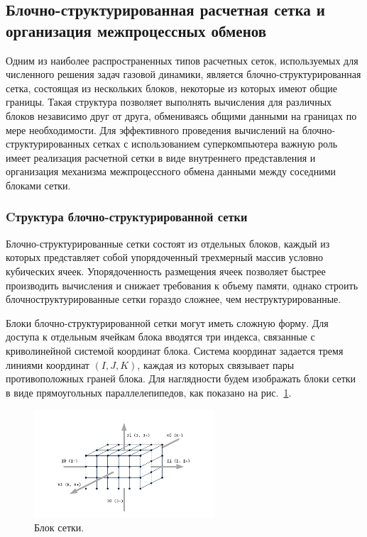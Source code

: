 \subsection{Блочно-структурированная расчетная сетка и организация межпроцессных обменов}

Одним из наиболее распространенных типов расчетных сеток, используемых для численного решения задач газовой динамики, является блочно-структурированная сетка, состоящая из нескольких блоков, некоторые из которых имеют общие границы.
Такая структура позволяет выполнять вычисления для различных блоков независимо друг от друга, обмениваясь общими данными на границах по мере необходимости.
Для эффективного проведения вычислений на блочно-структурированных сетках с использованием суперкомпьютера важную роль имеет реализация расчетной сетки в виде внутреннего представления и организация механизма межпроцессного обмена данными между соседними блоками сетки.

\subsubsection{Cтруктура блочно-структурированной сетки}

Блочно-структурированные сетки состоят из отдельных блоков, каждый из которых представляет собой упорядоченный трехмерный массив условно кубических ячеек.
Упорядоченность размещения ячеек позволяет быстрее производить вычисления и снижает требования к объему памяти, однако строить блочноструктурированные сетки гораздо сложнее, чем неструктурированные.

Блоки блочно-структурированной сетки могут иметь сложную форму.
Для доступа к отдельным ячейкам блока вводятся три индекса, связанные с криволинейной системой координат блока.
Система координат задается тремя линиями координат $(I, J, K)$, каждая из которых связывает пары противоположных граней блока.
Для наглядности будем изображать блоки сетки в виде прямоугольных параллелепипедов, как показано на рис.~\ref{fig:text_2_block_block}.

\begin{figure}[ht]
	\centering
	\includegraphics[width=0.6\textwidth]{./pics/text_2_block/1-block.pdf}
	\caption{Блок сетки.}
	\label{fig:text_2_block_block}
\end{figure}

